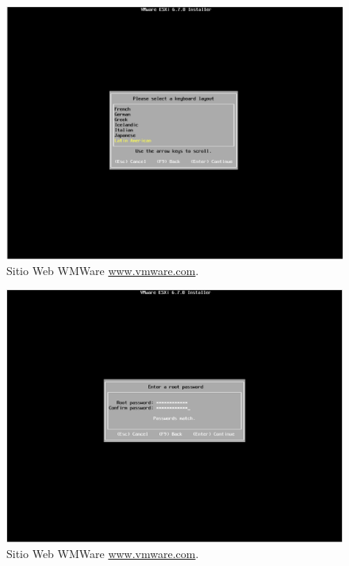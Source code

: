 \begin{figure}[!hbtp]
	\centering
	\includegraphics[width=\linewidth]{Trabajo/RecursosEducativos/RE01_VMwareESXi/RE_VMwareInstalacion09.png}
	\vspace{-0.2cm}
	\caption{Sitio Web WMWare \url{www.vmware.com}.\footnotemark[2]{} }
	\label{fig:VMwareInstalacion09}
\end{figure}


\begin{figure}[!hbtp]
	\centering
	\includegraphics[width=\linewidth]{Trabajo/RecursosEducativos/RE01_VMwareESXi/RE_VMwareInstalacion10.png}
	\vspace{-0.2cm}
	\caption{Sitio Web WMWare \url{www.vmware.com}.\footnotemark[2]{} }
	\label{fig:VMwareInstalacion10}
\end{figure}


